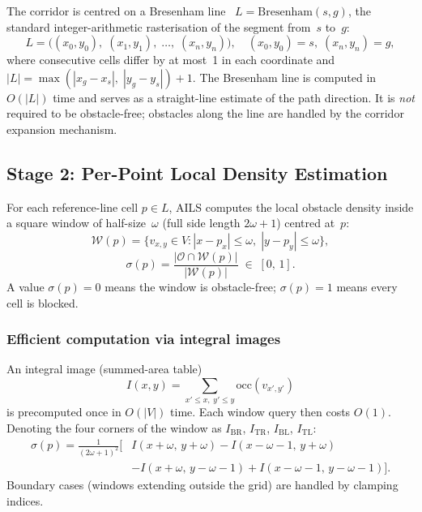 \documentclass[journal]{IEEEtran}
\begin{document}
The corridor is centred on a Bresenham line~\cite{bresenham1965algorithm} $L = \mathrm{Bresenham}(s, g)$, the standard integer-arithmetic rasterisation of the segment from~$s$ to~$g$:
\begin{equation}
    L = \bigl((x_0, y_0),\; (x_1, y_1),\; \ldots,\; (x_n, y_n)\bigr),
    \quad (x_0,y_0) = s,\; (x_n,y_n) = g,
\end{equation}
where consecutive cells differ by at most~1 in each coordinate and
$|L| = \max(|x_g - x_s|,\; |y_g - y_s|) + 1$.
The Bresenham line is computed in $O(|L|)$ time and serves as a straight-line estimate of the path direction.
It is \emph{not} required to be obstacle-free; obstacles along the line are handled by the corridor expansion mechanism.

\subsection{Stage 2: Per-Point Local Density Estimation}
\label{sec:density}

For each reference-line cell $p \in L$, AILS computes the local obstacle density inside a square window of half-size~$\omega$ (full side length $2\omega + 1$) centred at~$p$:
\begin{equation}
    \mathcal{W}(p) = \{v_{x,y} \in V : |x - p_x| \leq \omega,\; |y - p_y| \leq \omega\},
\end{equation}
\begin{equation}
    \sigma(p) = \frac{|\mathcal{O} \cap \mathcal{W}(p)|}{|\mathcal{W}(p)|} \;\in\; [0,\,1].
    \label{eq:density}
\end{equation}
A value $\sigma(p) = 0$ means the window is obstacle-free; $\sigma(p) = 1$ means every cell is blocked.

\subsubsection{Efficient computation via integral images}

An integral image (summed-area table)
\begin{equation}
    I(x, y) = \sum_{x' \leq x,\; y' \leq y} \mathrm{occ}(v_{x',y'})
\end{equation}
is precomputed once in $O(|V|)$ time.
Each window query then costs $O(1)$. Denoting the four corners of the window as $I_\text{BR}$, $I_\text{TR}$, $I_\text{BL}$, $I_\text{TL}$:
\begin{align}
    \sigma(p) = \frac{1}{(2\omega+1)^{2}} \bigl[
        &I(x{+}\omega,\, y{+}\omega) - I(x{-}\omega{-}1,\, y{+}\omega) \nonumber\\
        &- I(x{+}\omega,\, y{-}\omega{-}1) + I(x{-}\omega{-}1,\, y{-}\omega{-}1)
    \bigr].
\end{align}
Boundary cases (windows extending outside the grid) are handled by clamping indices.
\end{document}
